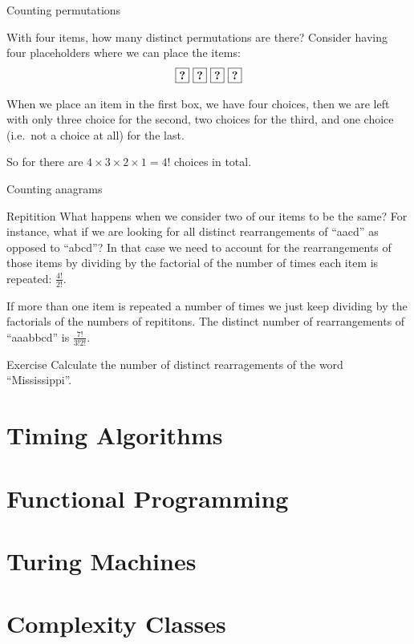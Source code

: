 \begin{frame}[fragile]{Counting permutations}
	\begin{block}{With four items, how many distinct permutations are there?}
		Consider having four placeholders where we can place the items:
		\[ \textbf{\fbox{?}} \  \textbf{\fbox{?}} \  \textbf{\fbox{?}} \  \textbf{\fbox{?}} \]
		
		When we place an item in the first box, we have four choices, then we are left with only three choice for the second, two choices for the third, and one choice (i.e.\ not a choice at all) for the last.

	So for there are $4 \times 3 \times 2 \times 1 = 4!$ choices in total.
	\end{block}


\end{frame}

\begin{frame}[fragile]{Counting anagrams}
	\begin{block}{Repitition}
		What happens when we consider two of our items to be the same?
		For instance, what if we are looking for all distinct rearrangements of ``aacd'' as opposed to ``abcd''?
	In that case we need to account for the rearrangements of those items by dividing by the factorial of the number of times each item is repeated: $\frac{4!}{2!}$.
	\end{block}
	
	If more than one item is repeated a number of times we just keep dividing by the factorials of the numbers of repititons.
	The distinct number of rearrangements of ``aaabbcd'' is $\frac{7!}{3!2!}$.

	\begin{block}{Exercise}
		Calculate the number of distinct rearragements of the word ``Mississippi''.
	\end{block}
\end{frame}

\section{Timing Algorithms}

\section{Functional Programming}

\section{Turing Machines}

\section{Complexity Classes}